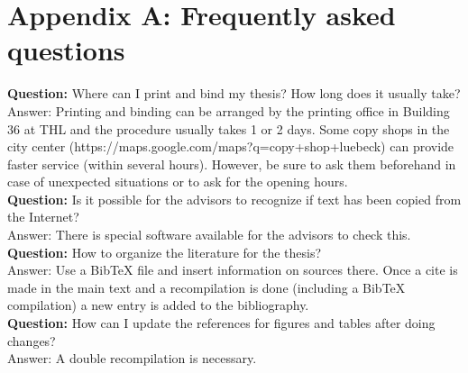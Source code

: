 \chapter{Appendix A: Frequently asked questions} \label{chap_faq}

\textbf{Question:} Where can I print and bind my thesis? How long does it usually take?\\
Answer: Printing and binding can be arranged by the printing office in Building 36 at THL and the procedure usually takes 1 or 2 days. Some copy shops in the city center (https://maps.google.com/maps?q=copy+shop+luebeck) can provide faster service (within several hours). However, be sure to ask them beforehand in case of unexpected situations or to ask for the opening hours. 
\\

\noindent\textbf{Question:} Is it possible for the advisors to recognize if text has been copied from the Internet? \\
Answer: There is special software available for the advisors to check this. 
\\

\noindent\textbf{Question:} How to organize the literature for the thesis? \\
Answer: Use a BibTeX file and insert information on sources there. Once a cite is made in the main text and a recompilation is done (including a BibTeX compilation) a new entry is added to the bibliography. 
\\

\noindent\textbf{Question:} How can I update the references for figures and tables after doing changes? \\
Answer: A double recompilation is necessary.
\\



\endinput 